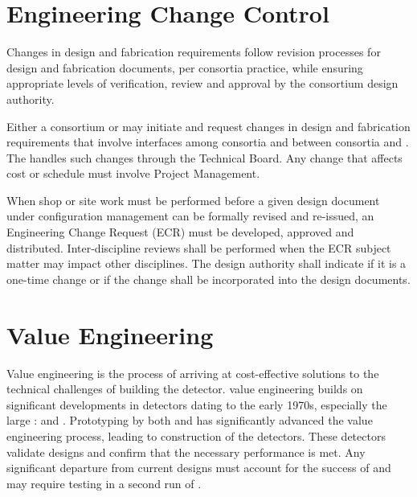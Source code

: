 \section{Engineering Change Control}
\label{sec:fdsp-change}

Changes in design and fabrication requirements follow revision processes
for design and fabrication documents, per  consortia practice,  while
ensuring appropriate levels of verification, review and approval %
by the consortium %
design authority.


Either a consortium or  may initiate and request changes in design and fabrication requirements that involve
interfaces among consortia and between consortia and .  The 
handles such changes through the Technical Board. Any change that
affects cost or schedule must involve Project Management.

When shop or site work must be performed before a given %
design
document under configuration management can be formally revised and re-issued, %
an Engineering Change Request (ECR) must be developed, approved and distributed. %
Inter-discipline reviews shall be
performed when the ECR subject matter may impact other
disciplines.  The design authority shall indicate if it is a one-time
change or if the change shall be incorporated into the design
documents. 



\section{Value Engineering}
\label{sec:fdsp-coord-ve}

Value engineering is the process of arriving at cost-effective
solutions to the technical challenges of building the 
detector.  value engineering builds on significant
developments in  detectors dating to the early 1970s,
especially the large :  and
. Prototyping by both  and  has
significantly advanced the value engineering process, leading to
construction of the  detectors. These detectors validate
 designs and confirm that the necessary performance is
met. Any significant departure from current designs must account for
the success of   and may require testing in a second
run of .  

